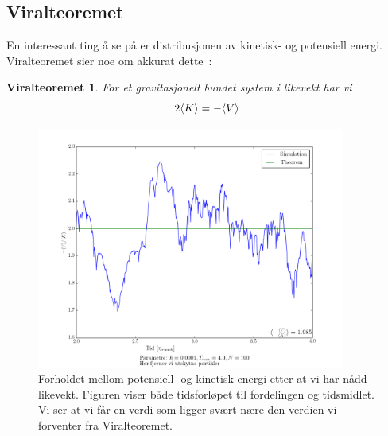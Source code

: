 \documentclass[11pt]{article}
\newtheorem*{viralthm}{Viralteoremet}
\begin{document}
\begin{multicols}{2}



\subsection{Viralteoremet}
En interessant ting å se på er distribusjonen av kinetisk- og
potensiell energi. Viralteoremet sier noe om akkurat dette~\cite{viralteoremet-wiki}:

\begin{viralthm}
  For et gravitasjonelt bundet system i likevekt har vi 
\begin{align}
  2\langle K \rangle = -\langle V \rangle
\end{align}
\end{viralthm} 

\end{multicols}
\begin{figure}[!ht]
  \centering
  \includegraphics[width=\textwidth,height=300px]{../fig/viral.png}
  \caption{\label{fig:viral} Forholdet mellom potensiell- og kinetisk
 energi etter at vi har nådd likevekt. Figuren viser både tidsforløpet
til fordelingen og tidsmidlet. Vi ser at vi får en verdi som ligger
svært nære den verdien vi forventer fra Viralteoremet.}
\end{figure}
\end{document}
